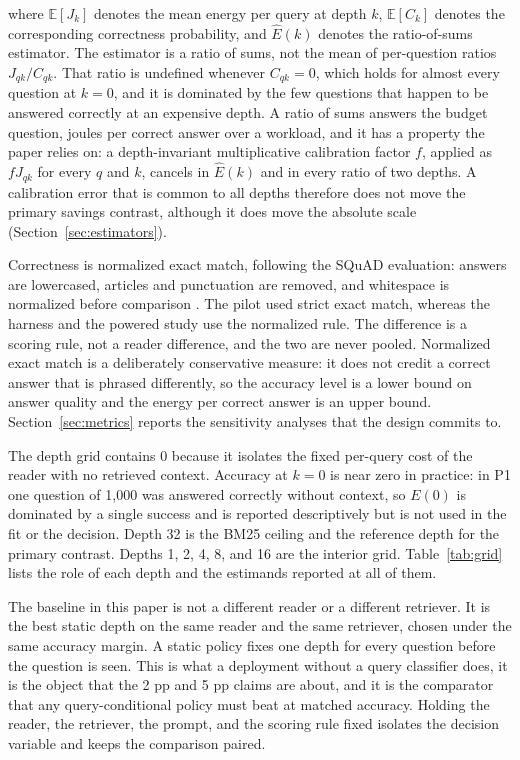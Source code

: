 \documentclass[a4paper,fleqn]{cas-sc}
\begin{document}
where $\mathbb{E}[J_{k}]$ denotes the mean energy per query at depth $k$, $\mathbb{E}[C_{k}]$ denotes the corresponding correctness probability, and $\widehat E(k)$ denotes the ratio-of-sums estimator. The estimator is a ratio of sums, not the mean of per-question ratios $J_{qk}/C_{qk}$. That ratio is undefined whenever $C_{qk}=0$, which holds for almost every question at $k=0$, and it is dominated by the few questions that happen to be answered correctly at an expensive depth. A ratio of sums answers the budget question, joules per correct answer over a workload, and it has a property the paper relies on: a depth-invariant multiplicative calibration factor $f$, applied as $fJ_{qk}$ for every $q$ and $k$, cancels in $\widehat E(k)$ and in every ratio of two depths. A calibration error that is common to all depths therefore does not move the primary savings contrast, although it does move the absolute scale (Section~\ref{sec:estimators}).

Correctness is normalized exact match, following the SQuAD evaluation: answers are lowercased, articles and punctuation are removed, and whitespace is normalized before comparison \cite{rajpurkar2016squad}. The pilot used strict exact match, whereas the harness and the powered study use the normalized rule. The difference is a scoring rule, not a reader difference, and the two are never pooled. Normalized exact match is a deliberately conservative measure: it does not credit a correct answer that is phrased differently, so the accuracy level is a lower bound on answer quality and the energy per correct answer is an upper bound. Section~\ref{sec:metrics} reports the sensitivity analyses that the design commits to.

The depth grid contains 0 because it isolates the fixed per-query cost of the reader with no retrieved context. Accuracy at $k=0$ is near zero in practice: in P1 one question of 1{,}000 was answered correctly without context, so $E(0)$ is dominated by a single success and is reported descriptively but is not used in the fit or the decision. Depth 32 is the BM25 ceiling and the reference depth for the primary contrast. Depths 1, 2, 4, 8, and 16 are the interior grid. Table~\ref{tab:grid} lists the role of each depth and the estimands reported at all of them.

The baseline in this paper is not a different reader or a different retriever. It is the best static depth on the same reader and the same retriever, chosen under the same accuracy margin. A static policy fixes one depth for every question before the question is seen. This is what a deployment without a query classifier does, it is the object that the 2 pp and 5 pp claims are about, and it is the comparator that any query-conditional policy must beat at matched accuracy. Holding the reader, the retriever, the prompt, and the scoring rule fixed isolates the decision variable and keeps the comparison paired.
\end{document}
